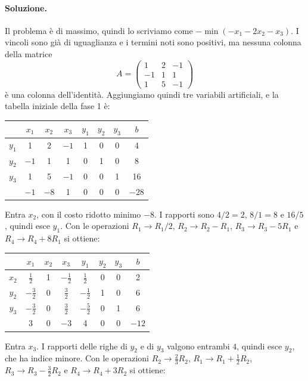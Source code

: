 \paragraph{Soluzione.}
Il problema è di massimo, quindi lo scriviamo come $-\min(-x_1 - 2x_2 - x_3)$. I vincoli sono già di uguaglianza e i termini noti sono positivi, ma nessuna colonna della matrice
\[
A = \begin{pmatrix} 1 & 2 & -1 \\ -1 & 1 & 1 \\ 1 & 5 & -1 \end{pmatrix}
\]
è una colonna dell'identità. Aggiungiamo quindi tre variabili artificiali, e la tabella iniziale della fase 1 è:
\begin{center}
\begin{tabular}{c|cccccc|c}
 & $x_1$ & $x_2$ & $x_3$ & $y_1$ & $y_2$ & $y_3$ & $b$ \\
\hline
$y_1$ & 1 & $\boxed{2}$ & $-1$ & 1 & 0 & 0 & 4 \\
$y_2$ & $-1$ & 1 & 1 & 0 & 1 & 0 & 8 \\
$y_3$ & 1 & 5 & $-1$ & 0 & 0 & 1 & 16 \\
\hline
 & $-1$ & $-8$ & 1 & 0 & 0 & 0 & $-28$ \\
\end{tabular}
\end{center}
Entra $x_2$, con il costo ridotto minimo $-8$. I rapporti sono $4/2 = 2$, $8/1 = 8$ e $16/5$, quindi esce $y_1$. Con le operazioni $R_1 \to R_1/2$, $R_2 \to R_2 - R_1$, $R_3 \to R_3 - 5R_1$ e $R_4 \to R_4 + 8R_1$ si ottiene:
\begin{center}
\begin{tabular}{c|cccccc|c}
 & $x_1$ & $x_2$ & $x_3$ & $y_1$ & $y_2$ & $y_3$ & $b$ \\
\hline
$x_2$ & $\frac12$ & 1 & $-\frac12$ & $\frac12$ & 0 & 0 & 2 \\
$y_2$ & $-\frac32$ & 0 & $\boxed{\tfrac32}$ & $-\frac12$ & 1 & 0 & 6 \\
$y_3$ & $-\frac32$ & 0 & $\frac32$ & $-\frac52$ & 0 & 1 & 6 \\
\hline
 & 3 & 0 & $-3$ & 4 & 0 & 0 & $-12$ \\
\end{tabular}
\end{center}
Entra $x_3$. I rapporti delle righe di $y_2$ e di $y_3$ valgono entrambi $4$, quindi esce $y_2$, che ha indice minore. Con le operazioni $R_2 \to \frac23 R_2$, $R_1 \to R_1 + \frac12 R_2$, $R_3 \to R_3 - \frac32 R_2$ e $R_4 \to R_4 + 3R_2$ si ottiene:
